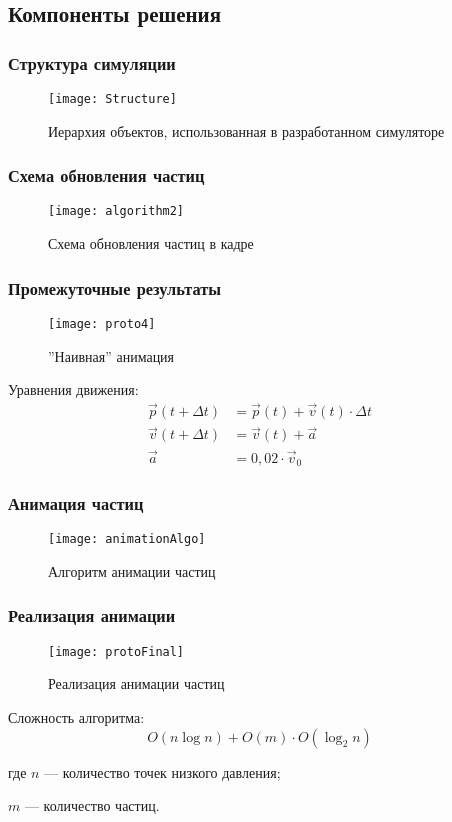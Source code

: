 \subsection{Компоненты решения}
\begin{frame}
\frametitle{Структура симуляции}
\begin{figure}[htb]
	\centering
	\texttt{[image: Structure]}
    \caption{Иерархия объектов, использованная в разработанном симуляторе}%
    \label{fig:simStructure}
\end{figure}
\end{frame}

\begin{frame}
\frametitle{Схема обновления частиц}
\begin{figure}
	\centering
	\texttt{[image: algorithm2]}
    \caption{Схема обновления частиц в кадре}%
    \label{fig:algorithm}
\end{figure}
\end{frame}

\begin{frame}
\frametitle{Промежуточные результаты}
\begin{wrapfigure}{r}{0.4\textwidth}
	\centering
    \texttt{[image: proto4]}
    \caption{''Наивная'' анимация}%
    \label{fig:proto4}
\end{wrapfigure}

Уравнения движения:
\begin{align}
  \label{eq:position}
  \vec{p}(t + \Delta{t}) &= \vec{p}(t) + \vec{v}(t) \cdot \Delta{t} \\
  \label{eq:velocity}
  \vec{v}(t + \Delta{t}) &= \vec{v}(t) + \vec{a} \\
  \label{eq:accelearation}
  \vec{a} &= 0,02 \cdot \vec{v}_{0}
\end{align}
\end{frame}

\begin{frame}
\frametitle{Анимация частиц}
\begin{figure}
	\centering
    \texttt{[image: animationAlgo]}
    \caption{Алгоритм анимации частиц}%
    \label{fig:animationAlgo}
\end{figure}
\end{frame}

\begin{frame}[t]
\frametitle{Реализация анимации}
\begin{wrapfigure}{r}{0.3\textwidth}
	\centering
    \texttt{[image: protoFinal]}
    \caption{Реализация анимации частиц}%
    \label{fig:protoFinal}
\end{wrapfigure}
Сложность алгоритма:
\begin{equation}
    O(n \log n) + O(m) \cdot O(\log_{2} n)
\end{equation}
\begin{explanationx}
    \item [где] $n$ --- количество точек низкого давления;
    \item $m$ --- количество частиц.
\end{explanationx}
\end{frame}

